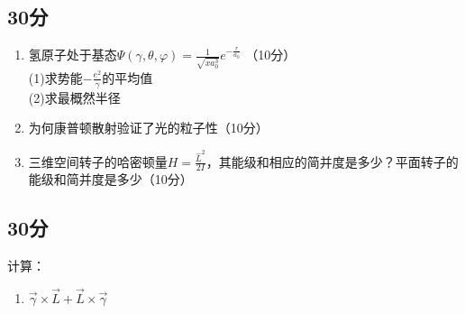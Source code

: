 
\subsection{30分}
\begin{enumerate}
\item 氢原子处于基态$\varPsi(\gamma,\theta,\varphi)=\frac{1}{\sqrt{xa^{3}_{0}}}e^{-\frac{r}{a_0}}$ （10分）\\
(1)求势能$-\frac{e^2}{\gamma}$的平均值\\
(2)求最概然半径\\
\item 为何康普顿散射验证了光的粒子性（10分）\\
\item 三维空间转子的哈密顿量$H=\frac{\hat{L}^2}{2I}$，其能级和相应的简并度是多少？平面转子的能级和简并度是多少（10分）\\

\end{enumerate}
\subsection{30分}
计算：\\
\begin{enumerate}
\item $\vec{\gamma}\times \vec{L}+ \vec{L}\times \vec{\gamma}$
\end{enumerate}